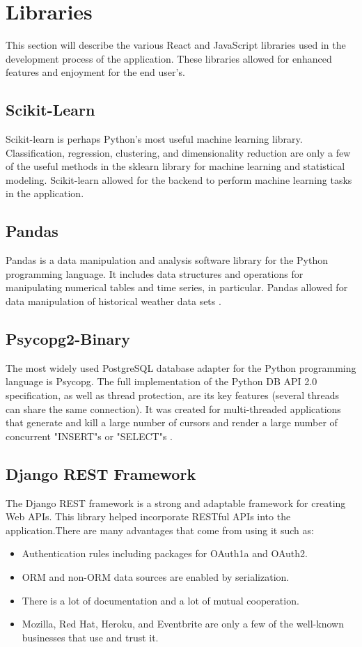 \section{Libraries}
This section will describe the various React and JavaScript libraries used in the development process of the application. These libraries allowed for enhanced features and enjoyment for the end user's. 

\subsection{Scikit-Learn}
Scikit-learn is perhaps Python's most useful machine learning library. Classification, regression, clustering, and dimensionality reduction are only a few of the useful methods in the sklearn library for machine learning and statistical modeling. Scikit-learn allowed for the backend to perform machine learning tasks in the application.

\subsection{Pandas}
Pandas is a data manipulation and analysis software library for the Python programming language. It includes data structures and operations for manipulating numerical tables and time series, in particular. Pandas allowed for data manipulation of historical weather data sets \cite{Pandas}. 

\subsection{Psycopg2-Binary}
The most widely used PostgreSQL database adapter for the Python programming language is Psycopg. The full implementation of the Python DB API 2.0 specification, as well as thread protection, are its key features (several threads can share the same connection). It was created for multi-threaded applications that generate and kill a large number of cursors and render a large number of concurrent "INSERT"s or "SELECT"s \cite{psycopg2Binary}.
\subsection{Django REST Framework}
The Django REST framework is a strong and adaptable framework for creating Web APIs. This library helped incorporate RESTful APIs into the application.There are many advantages that come from using it such as:

\begin{itemize}
    \item Authentication rules including packages for OAuth1a and OAuth2.
    \item ORM and non-ORM data sources are enabled by serialization.
    \item There is a lot of documentation and a lot of mutual cooperation.
    \item Mozilla, Red Hat, Heroku, and Eventbrite are only a few of the well-known businesses that use and trust it.
\end{itemize}

